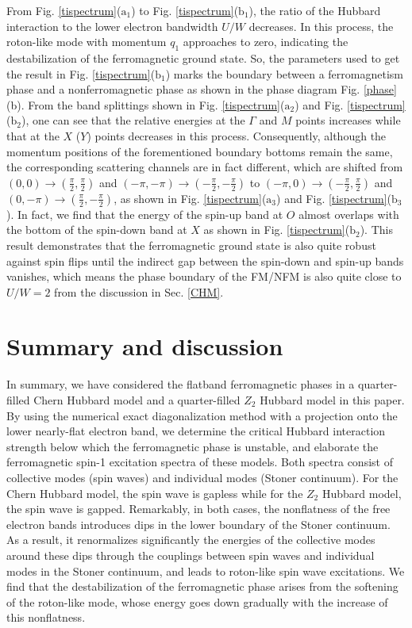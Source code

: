 \documentclass[amsmath,superscriptaddress,showpacs,aps,prb,twocolumn]{revtex4-1}
\begin{document}
\par From Fig. \ref{tispectrum}($\text{a}_1$) to Fig. \ref{tispectrum}($\text{b}_1$), the ratio of the Hubbard interaction to the lower electron bandwidth $U/W$ decreases. In this process, the roton-like mode with momentum $q_1$ approaches to zero, indicating the destabilization of the ferromagnetic ground state. So, the parameters used to get the result in Fig. \ref{tispectrum}($\text{b}_1$) marks the boundary between a ferromagnetism phase and a nonferromagnetic phase as shown in the phase diagram Fig. \ref{phase}(b). From the band splittings shown in Fig. \ref{tispectrum}($\text{a}_2$) and Fig. \ref{tispectrum}($\text{b}_2$), one can see that the relative energies at the $\Gamma$ and $M$ points increases while that at the $X$ ($Y$) points decreases in this process. Consequently, although the momentum positions of the forementioned boundary bottoms remain the same, the corresponding scattering channels are in fact different, which are shifted from $(0,0)\rightarrow(\frac{\pi}{2},\frac{\pi}{2})$ and $(-\pi,-\pi)\rightarrow(-\frac{\pi}{2},-\frac{\pi}{2})$ to $(-\pi,0)\rightarrow(-\frac{\pi}{2},\frac{\pi}{2})$ and $(0,-\pi)\rightarrow(\frac{\pi}{2},-\frac{\pi}{2})$, as shown in Fig. \ref{tispectrum}($\text{a}_3$) and Fig. \ref{tispectrum}($\text{b}_3$). In fact, we find that the energy of the spin-up band at $O$ almost overlaps with the bottom of the spin-down band at $X$ as shown in Fig. \ref{tispectrum}($\text{b}_2$). This result demonstrates that the ferromagnetic ground state is also quite robust against spin flips until the indirect gap between the spin-down and spin-up bands vanishes, which means the phase boundary of the FM/NFM is also quite close to $U/W=2$ from the discussion in Sec. \ref{CHM}.

\section{Summary and discussion}\label{sd}
\par In summary, we have considered the flatband ferromagnetic phases in a quarter-filled Chern Hubbard model and a quarter-filled $Z_2$ Hubbard model in this paper. By using the numerical exact diagonalization method with a projection onto the lower nearly-flat electron band, we determine the critical Hubbard interaction strength below which the ferromagnetic phase is unstable, and elaborate the ferromagnetic spin-1 excitation spectra of these models. Both spectra consist of collective modes (spin waves) and individual modes (Stoner continuum). For the Chern Hubbard model, the spin wave is gapless while for the $Z_2$ Hubbard model, the spin wave is gapped. Remarkably, in both cases, the nonflatness of the free electron bands introduces dips in the lower boundary of the Stoner continuum. As a result, it renormalizes significantly the energies of the collective modes around these dips through the couplings between spin waves and individual modes in the Stoner continuum, and leads to roton-like spin wave excitations. We find that the destabilization of the ferromagnetic phase arises from the softening of the roton-like mode, whose energy goes down gradually with the increase of this nonflatness.
\end{document}
